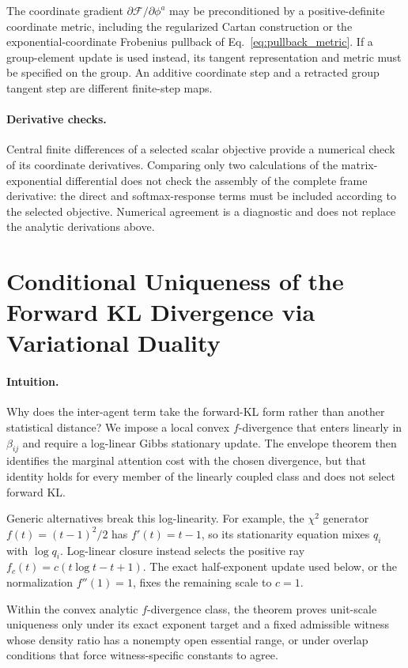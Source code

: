 \documentclass[twoside,11pt]{article}
\begin{document}
The coordinate gradient $\partial\mathcal F/\partial\phi^a$ may be preconditioned by a positive-definite coordinate metric, including the regularized Cartan construction or the exponential-coordinate Frobenius pullback of Eq.~\eqref{eq:pullback_metric}. If a group-element update is used instead, its tangent representation and metric must be specified on the group. An additive coordinate step and a retracted group tangent step are different finite-step maps.


\paragraph{Derivative checks.} Central finite differences of a selected scalar objective provide a numerical check of its coordinate derivatives. Comparing only two calculations of the matrix-exponential differential does not check the assembly of the complete frame derivative: the direct and softmax-response terms must be included according to the selected objective. Numerical agreement is a diagnostic and does not replace the analytic derivations above.


\section{Conditional Uniqueness of the Forward KL Divergence via Variational Duality}
\label{sec:supp_conditional_uniqueness}

\paragraph{Intuition.}
Why does the inter-agent term take the forward-KL form rather than another statistical distance? We impose a local convex $f$-divergence that enters linearly in $\beta_{ij}$ and require a log-linear Gibbs stationary update. The envelope theorem then identifies the marginal attention cost with the chosen divergence, but that identity holds for every member of the linearly coupled class and does not select forward KL.

Generic alternatives break this log-linearity. For example, the $\chi^2$ generator $f(t)=(t-1)^2/2$ has $f'(t)=t-1$, so its stationarity equation mixes $q_i$ with $\log q_i$. Log-linear closure instead selects the positive ray $f_c(t)=c(t\log t-t+1)$. The exact half-exponent update used below, or the normalization $f''(1)=1$, fixes the remaining scale to $c=1$.

Within the convex analytic $f$-divergence class, the theorem proves unit-scale uniqueness only under its exact exponent target and a fixed admissible witness whose density ratio has a nonempty open essential range, or under overlap conditions that force witness-specific constants to agree.
\end{document}
